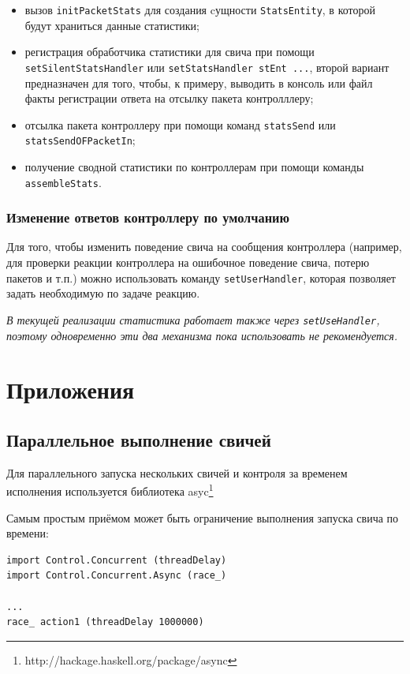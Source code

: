 \documentclass[9pt,a4paper]{article}
\begin{document}
\begin{itemize}
  \item вызов \lstinline!initPacketStats! для создания cущности \lstinline!StatsEntity!,
    в которой будут храниться данные статистики;
  \item регистрация обработчика статистики для свича при помощи 
    \lstinline!setSilentStatsHandler! или \lstinline!setStatsHandler stEnt ...!,
    второй вариант предназначен для того, чтобы, к примеру, выводить в консоль или
    файл факты регистрации ответа на отсылку пакета контролллеру;
  \item отсылка пакета контроллеру при помощи команд \lstinline!statsSend! или
    \lstinline!statsSendOFPacketIn!;
  \item получение сводной статистики по контроллерам при помощи команды
    \lstinline!assembleStats!.
\end{itemize}

\subsubsection{Изменение ответов контроллеру по умолчанию}

Для того, чтобы изменить поведение свича на сообщения контроллера (например, для
проверки реакции контроллера на ошибочное поведение свича, потерю пакетов и т.п.)
можно использовать команду \lstinline!setUserHandler!, которая позволяет задать
необходимую по задаче реакцию.

\emph{В текущей реализации статистика работает также через \lstinline!setUseHandler!,
поэтому одновременно эти два механизма пока использовать не рекомендуется.}

\section{Приложения}

\subsection{Параллельное выполнение свичей}

Для параллельного запуска нескольких свичей и контроля за временем исполнения
используется библиотека asyc\footnote{http://hackage.haskell.org/package/async}

Самым простым приёмом может быть ограничение выполнения запуска свича по времени:

\begin{lstlisting}
import Control.Concurrent (threadDelay)
import Control.Concurrent.Async (race_)

...
race_ action1 (threadDelay 1000000)
\end{lstlisting}
\end{document}
